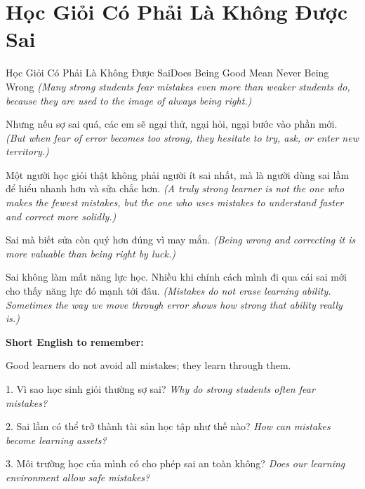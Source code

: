 \section{Học Giỏi Có Phải Là Không Được Sai}
\begin{truyen}{Học Giỏi Có Phải Là Không Được Sai}{Does Being Good Mean Never Being Wrong}
\textit{(Many strong students fear mistakes even more than weaker students do, because they are used to the image of always being right.)}

Nhưng nếu sợ sai quá, các em sẽ ngại thử, ngại hỏi, ngại bước vào phần mới.
\textit{(But when fear of error becomes too strong, they hesitate to try, ask, or enter new territory.)}

Một người học giỏi thật không phải người ít sai nhất, mà là người dùng sai lầm để hiểu nhanh hơn và sửa chắc hơn.
\textit{(A truly strong learner is not the one who makes the fewest mistakes, but the one who uses mistakes to understand faster and correct more solidly.)}

Sai mà biết sửa còn quý hơn đúng vì may mắn.
\textit{(Being wrong and correcting it is more valuable than being right by luck.)}
\end{truyen}

\begin{baihoc}
Sai không làm mất năng lực học. Nhiều khi chính cách mình đi qua cái sai mới cho thấy năng lực đó mạnh tới đâu.
\textit{(Mistakes do not erase learning ability. Sometimes the way we move through error shows how strong that ability really is.)}
\end{baihoc}

\begin{ghinhoanh}
\textbf{Short English to remember:}

Good learners do not avoid all mistakes; they learn through them.

\end{ghinhoanh}

\begin{tuhocnhanh}
1. Vì sao học sinh giỏi thường sợ sai? \textit{Why do strong students often fear mistakes?}

2. Sai lầm có thể trở thành tài sản học tập như thế nào? \textit{How can mistakes become learning assets?}

3. Môi trường học của mình có cho phép sai an toàn không? \textit{Does our learning environment allow safe mistakes?}
\end{tuhocnhanh}
\ngancach

